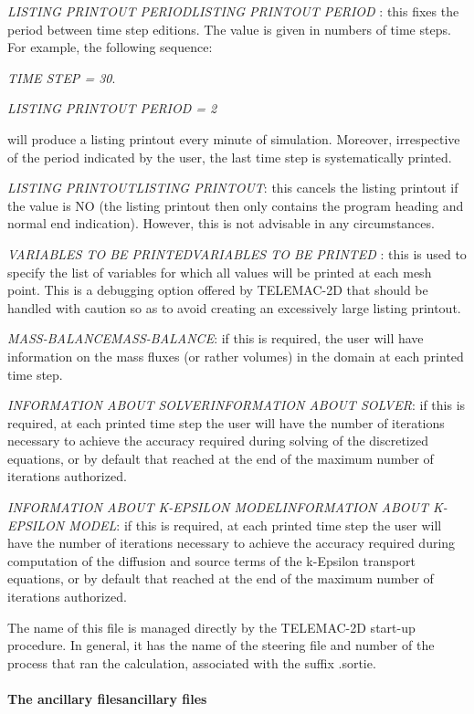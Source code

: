 \documentclass{article} %
\begin{document}
 \textit{LISTING PRINTOUT PERIODLISTING PRINTOUT PERIOD }: this fixes the period between time step editions. The value is given in numbers of time steps. For example, the following sequence:

    \textit{TIME STEP = 30}.

    \textit{LISTING PRINTOUT PERIOD = 2}

 will produce a listing printout every minute of simulation. Moreover, irrespective of the period indicated by the user, the last time step is systematically printed.

 \textit{LISTING PRINTOUTLISTING PRINTOUT}: this cancels the listing printout if the value is NO (the listing printout then only contains the program heading and normal end indication). However, this is not advisable in any circumstances.

 \textit{VARIABLES TO BE PRINTEDVARIABLES TO BE PRINTED }: this is used to specify the list of variables for which all values will be printed at each mesh point. This is a debugging option offered by TELEMAC-2D that should be handled with caution so as to avoid creating an excessively large listing printout.

 \textit{MASS-BALANCEMASS-BALANCE}: if this is required, the user will have information on the mass fluxes (or rather volumes) in the domain at each printed time step.

 \textit{INFORMATION ABOUT SOLVERINFORMATION ABOUT SOLVER}: if this is required, at each printed time step the user will have the number of iterations necessary to achieve the accuracy required during solving of the discretized equations, or by default that reached at the end of the maximum number of iterations authorized.

 \textit{INFORMATION ABOUT K-EPSILON MODELINFORMATION ABOUT K-EPSILON MODEL}: if this is required, at each printed time step the user will have the number of iterations necessary to achieve the accuracy required during computation of the diffusion and source terms of the k-Epsilon transport equations, or by default that reached at the end of the maximum number of iterations authorized.

 The name of this file is managed directly by the TELEMAC-2D start-up procedure. In general, it has the name of the steering file and number of the process that ran the calculation, associated with the suffix .sortie.


\paragraph{ The ancillary filesancillary files}
\end{document}
